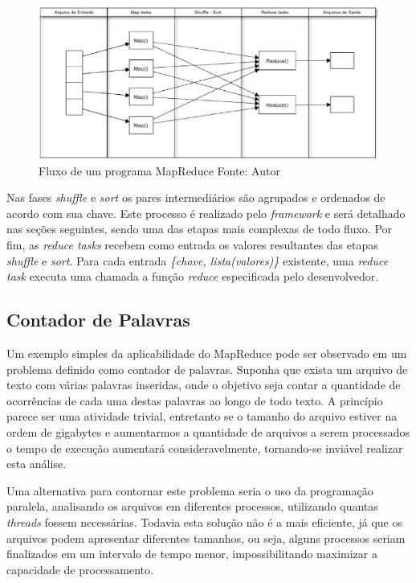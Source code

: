 \begin{figure}[ht!]
	\centering
	\includegraphics[keepaspectratio=true,scale=0.5]
	  {figuras/mapreduce.eps}
	\caption[Fluxo de um programa MapReduce]{Fluxo de um programa MapReduce
	\protect\linebreak Fonte: Autor}
	\label{fig-mapreduce}
\end{figure}
\FloatBarrier

Nas fases \textit{shuffle} e \textit{sort} os pares intermediários são agrupados e ordenados de acordo com sua chave. Este processo é realizado pelo \textit{framework} e será detalhado nas seções seguintes, sendo uma das etapas mais complexas de todo fluxo. Por fim, as \textit{reduce tasks} recebem como entrada os valores resultantes das etapas \textit{shuffle} e \textit{sort}. Para cada entrada \textit{\{chave, lista(valores)\}} existente, uma \textit{reduce task} executa uma chamada a função \textit{reduce} especificada pelo desenvolvedor.

\subsection{Contador de Palavras}
\label{sec-wc}

Um exemplo simples da aplicabilidade do MapReduce pode ser observado em um problema definido como contador de palavras. Suponha que exista um arquivo de texto com várias palavras inseridas, onde o objetivo seja contar a quantidade de ocorrências de cada uma destas palavras ao longo de todo texto. A princípio parece ser uma atividade trivial, entretanto se o tamanho do arquivo estiver na ordem de gigabytes e aumentarmos a quantidade de arquivos a serem processados o tempo de execução aumentará consideravelmente, tornando-se inviável realizar esta análise.

Uma alternativa para contornar este problema seria o uso da programação paralela, analisando os arquivos em diferentes processos, utilizando quantas \textit{threads} fossem necessárias. Todavia esta solução não é a mais eficiente, já que os arquivos podem apresentar diferentes tamanhos, ou seja, alguns processos seriam finalizados em um intervalo de tempo menor, impossibilitando maximizar a capacidade de processamento. 

